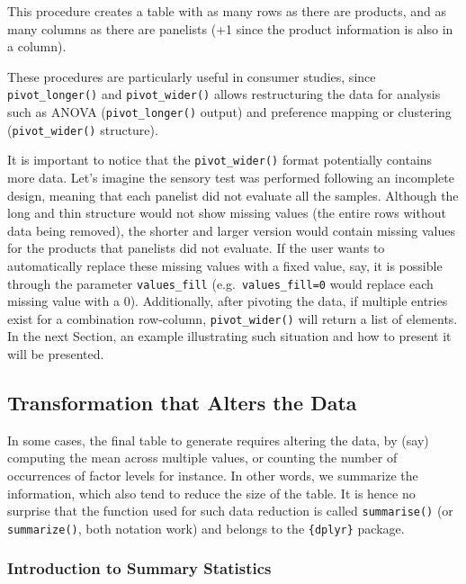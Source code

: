 \documentclass[
]{krantz}
\begin{document}
This procedure creates a table with as many rows as there are products, and as many columns as there are panelists (+1 since the product information is also in a column).

These procedures are particularly useful in consumer studies, since \texttt{pivot\_longer()} and \texttt{pivot\_wider()} allows restructuring the data for analysis such as ANOVA (\texttt{pivot\_longer()} output) and preference mapping or clustering (\texttt{pivot\_wider()} structure).

It is important to notice that the \texttt{pivot\_wider()} format potentially contains more data. Let's imagine the sensory test was performed following an incomplete design, meaning that each panelist did not evaluate all the samples. Although the long and thin structure would not show missing values (the entire rows without data being removed), the shorter and larger version would contain missing values for the products that panelists did not evaluate. If the user wants to automatically replace these missing values with a fixed value, say, it is possible through the parameter \texttt{values\_fill} (e.g.~\texttt{values\_fill=0} would replace each missing value with a 0). Additionally, after pivoting the data, if multiple entries exist for a combination row-column, \texttt{pivot\_wider()} will return a list of elements. In the next Section, an example illustrating such situation and how to present it will be presented.

\hypertarget{transformation-that-alters-the-data}{%
\subsection{Transformation that Alters the Data}\label{transformation-that-alters-the-data}}

In some cases, the final table to generate requires altering the data, by (say) computing the mean across multiple values, or counting the number of occurrences of factor levels for instance. In other words, we summarize the information, which also tend to reduce the size of the table. It is hence no surprise that the function used for such data reduction is called \texttt{summarise()} (or \texttt{summarize()}, both notation work) and belongs to the \texttt{\{dplyr\}} package.

\hypertarget{introduction-to-summary-statistics}{%
\subsubsection{Introduction to Summary Statistics}\label{introduction-to-summary-statistics}}
\end{document}
